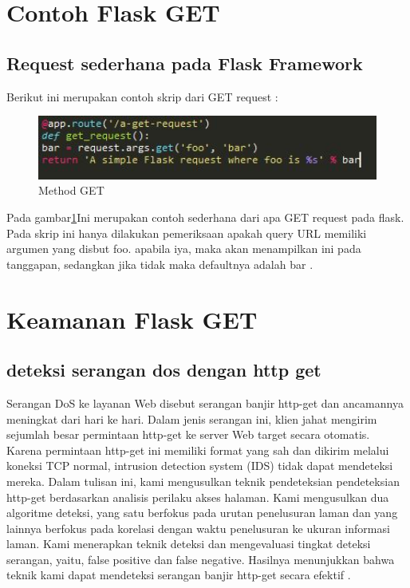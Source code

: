 \section{Contoh Flask GET}
\subsection{Request sederhana pada Flask Framework}
Berikut ini merupakan contoh skrip dari GET request :
\begin{figure}[ht]
\centerline{\includegraphics[width=1\textwidth]{figures/3FlaskGet.jpg}}
\caption{Method GET}
\label{labelgambar}
\end{figure}
Pada gambar\ref{labelgambar}Ini merupakan contoh sederhana dari apa GET request pada flask. Pada skrip ini hanya dilakukan pemeriksaan apakah query URL memiliki argumen yang disbut foo. apabila iya, maka akan menampilkan ini pada tanggapan, sedangkan jika tidak maka defaultnya adalah bar \cite{aggarwal2014flask}.

\section{Keamanan Flask GET}
\subsection{deteksi serangan dos dengan http get}
Serangan DoS ke layanan Web disebut serangan banjir http-get dan ancamannya meningkat dari hari ke hari. Dalam jenis serangan ini, klien jahat mengirim sejumlah besar permintaan http-get ke server Web target secara otomatis. Karena permintaan http-get ini memiliki format yang sah dan dikirim melalui koneksi TCP normal, intrusion detection system (IDS) tidak dapat mendeteksi mereka. Dalam tulisan ini, kami mengusulkan teknik pendeteksian pendeteksian http-get berdasarkan analisis perilaku akses halaman. Kami mengusulkan dua algoritme deteksi, yang satu berfokus pada urutan penelusuran laman dan yang lainnya berfokus pada korelasi dengan waktu penelusuran ke ukuran informasi laman. Kami menerapkan teknik deteksi dan mengevaluasi tingkat deteksi serangan, yaitu, false positive dan false negative. Hasilnya menunjukkan bahwa teknik kami dapat mendeteksi serangan banjir http-get secara efektif \cite{yatagai2007detection}.



